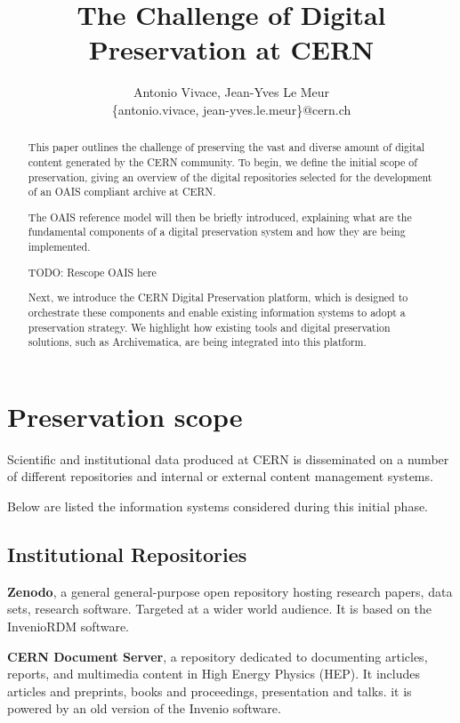 \documentclass[11pt]{IEEEtran}
\title{ The Challenge of Digital Preservation at CERN }
\author{Antonio Vivace, Jean-Yves Le Meur\\
    \{antonio.vivace, jean-yves.le.meur\}@cern.ch}
\begin{document}
\maketitle

\begin{abstract}
This paper outlines the challenge of preserving the vast and diverse amount of digital content generated by the CERN community.
To begin, we define the initial scope of preservation, giving an overview of the digital repositories selected for the development of an OAIS compliant archive at CERN.

The OAIS reference model will then be briefly introduced, explaining what are the fundamental components of a digital preservation system and how they are being  implemented.

TODO: Rescope OAIS here

Next, we introduce the CERN Digital Preservation platform, which is designed to orchestrate these components and enable existing information systems to adopt a preservation strategy. We highlight how existing tools and digital preservation solutions, such as Archivematica, are being integrated into this platform.

\end{abstract}

\section{Preservation scope}

Scientific and institutional data produced at CERN is disseminated on a number of different repositories and internal or external content management systems.

Below are listed the information systems considered during this initial phase.

\subsection{Institutional Repositories}

\textbf{Zenodo}, a general general-purpose open repository hosting research papers, data sets, research software. Targeted at a wider world audience. It is based on the InvenioRDM \cite{InvenioRDMinveniosoftwareorg-2023-03-16} software.

\textbf{CERN Document Server}, a repository dedicated to documenting articles, reports, and multimedia content in High Energy Physics (HEP). It includes articles and preprints, books and proceedings, presentation and talks. it is powered by an old version of the Invenio software.
\end{document}

